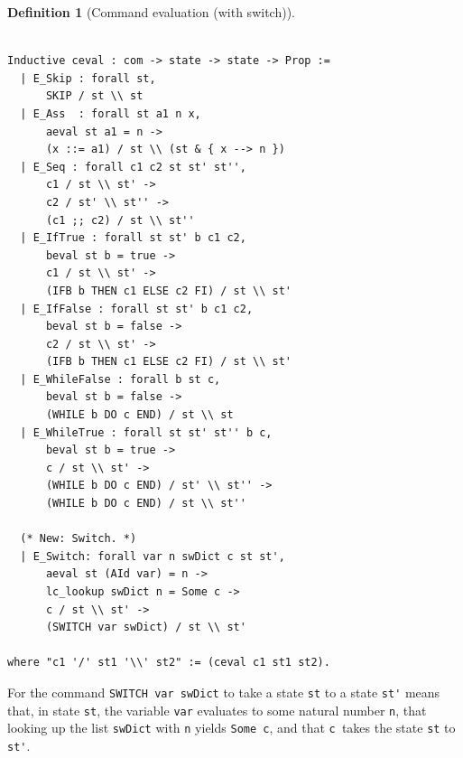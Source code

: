 \documentclass[12pt,notitlepage]{report}
\theoremstyle{plain}
\theoremstyle{definition}
\newtheorem{defin}[theo]{Definition}
\numberwithin{equation}{section}
\begin{document}
\begin{defin}[Command evaluation (with switch)]
\begin{verbatim}

Inductive ceval : com -> state -> state -> Prop :=
  | E_Skip : forall st,
      SKIP / st \\ st
  | E_Ass  : forall st a1 n x,
      aeval st a1 = n ->
      (x ::= a1) / st \\ (st & { x --> n })
  | E_Seq : forall c1 c2 st st' st'',
      c1 / st \\ st' ->
      c2 / st' \\ st'' ->
      (c1 ;; c2) / st \\ st''
  | E_IfTrue : forall st st' b c1 c2,
      beval st b = true ->
      c1 / st \\ st' ->
      (IFB b THEN c1 ELSE c2 FI) / st \\ st'
  | E_IfFalse : forall st st' b c1 c2,
      beval st b = false ->
      c2 / st \\ st' ->
      (IFB b THEN c1 ELSE c2 FI) / st \\ st'
  | E_WhileFalse : forall b st c,
      beval st b = false ->
      (WHILE b DO c END) / st \\ st
  | E_WhileTrue : forall st st' st'' b c,
      beval st b = true ->
      c / st \\ st' ->
      (WHILE b DO c END) / st' \\ st'' ->
      (WHILE b DO c END) / st \\ st''

  (* New: Switch. *)
  | E_Switch: forall var n swDict c st st',
      aeval st (AId var) = n ->                       
      lc_lookup swDict n = Some c ->                  
      c / st \\ st' ->                           
      (SWITCH var swDict) / st \\ st' 
               
where "c1 '/' st1 '\\' st2" := (ceval c1 st1 st2).
\end{verbatim}
For the command \verb$SWITCH var swDict$ to take a state \verb$st$ to a state \verb$st'$ means that, in state \verb$st$, the variable \verb$var$ evaluates to some natural number \verb$n$, that looking up the list \verb$swDict$ with \verb$n$ yields \verb$Some c$, and that \verb$c $takes the state \verb$st$ to \verb$st'$.
\end{defin}
\end{document}
